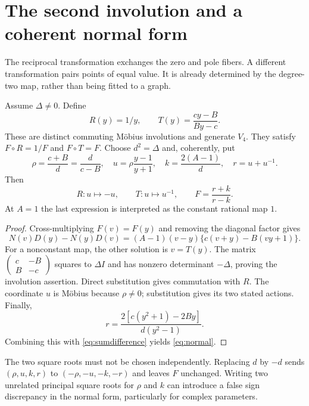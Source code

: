 \section{The second involution and a coherent normal form}\label{sec:normal}

The reciprocal transformation exchanges the zero and pole fibers. A different transformation pairs points of equal value. It is already determined by the degree-two map, rather than being fitted to a graph.

\begin{theorem}\label{thm:normal}
Assume \(\Delta\ne0\). Define
\begin{equation}\label{eq:RT}
R(y)=1/y,\qquad T(y)=\frac{cy-B}{By-c}.
\end{equation}
These are distinct commuting Möbius involutions and generate \(V_4\). They satisfy \(F\circ R=1/F\) and \(F\circ T=F\). Choose \(d^2=\Delta\) and, coherently, put
\begin{equation}\label{eq:uk}
\rho=\frac{c+B}{d}=\frac{d}{c-B},\quad
u=\rho\frac{y-1}{y+1},\quad k=\frac{2(A-1)}d,
\quad r=u+u^{-1}.
\end{equation}
Then
\begin{equation}\label{eq:normal}
R:u\mapsto-u,\qquad T:u\mapsto u^{-1},\qquad
F=\frac{r+k}{r-k}.
\end{equation}
At \(A=1\) the last expression is interpreted as the constant rational map \(1\).
\end{theorem}
\begin{proof}
Cross-multiplying \(F(v)=F(y)\) and removing the diagonal factor gives
\[
N(v)D(y)-N(y)D(v)
=(A-1)(v-y)\{c(v+y)-B(vy+1)\}.
\]
For a nonconstant map, the other solution is \(v=T(y)\). The matrix
\(\left(\begin{smallmatrix}c&-B\\B&-c\end{smallmatrix}\right)\)
squares to \(\Delta I\) and has nonzero determinant \(-\Delta\), proving the involution assertion. Direct substitution gives commutation with \(R\). The coordinate \(u\) is Möbius because \(\rho\ne0\); substitution gives its two stated actions. Finally,
\[
r=\frac{2[c(y^2+1)-2By]}{d(y^2-1)}.
\]
Combining this with \eqref{eq:sumdifference} yields \eqref{eq:normal}.
\end{proof}

The two square roots must not be chosen independently. Replacing \(d\) by \(-d\) sends \((\rho,u,k,r)\) to \((-\rho,-u,-k,-r)\) and leaves \(F\) unchanged. Writing two unrelated principal square roots for \(\rho\) and \(k\) can introduce a false sign discrepancy in the normal form, particularly for complex parameters.

